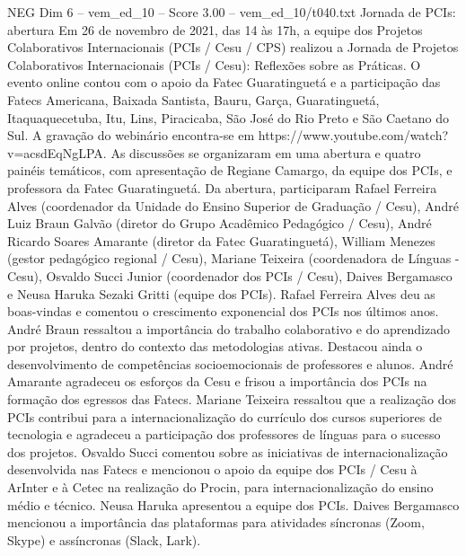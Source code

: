 \begin{textsample}{NEG Dim 6 – vem\_ed\_10 – Score 3.00 – vem\_ed\_10/t040.txt}  \label{ex:f6_neg_128}
Jornada de PCIs: abertura Em 26 de novembro de 2021, das 14 às 17h, a equipe dos Projetos Colaborativos Internacionais (PCIs / Cesu / CPS) realizou a Jornada de Projetos Colaborativos Internacionais (PCIs / Cesu): Reflexões sobre as Práticas.
O evento online contou com o apoio da Fatec Guaratinguetá e a participação das Fatecs Americana, Baixada Santista, Bauru, Garça, Guaratinguetá, Itaquaquecetuba, Itu, Lins, Piracicaba, São José do Rio Preto e São Caetano do Sul.
A gravação do webinário encontra-se em https://www.youtube.com/watch?v=acsdEqNgLPA.
As discussões se organizaram em uma abertura e quatro painéis temáticos, com apresentação de Regiane Camargo, da equipe dos PCIs, e professora da Fatec Guaratinguetá.
Da abertura, participaram Rafael Ferreira Alves (coordenador da Unidade do Ensino Superior de Graduação / Cesu), André Luiz Braun Galvão (diretor do Grupo Acadêmico Pedagógico / Cesu), André Ricardo Soares Amarante (diretor da Fatec Guaratinguetá), William Menezes (gestor pedagógico regional / Cesu), Mariane Teixeira (coordenadora de Línguas - Cesu), Osvaldo Succi Junior (coordenador dos PCIs / Cesu), Daives Bergamasco e Neusa Haruka Sezaki Gritti (equipe dos PCIs).
Rafael Ferreira Alves deu as boas-vindas e comentou o crescimento exponencial dos PCIs nos últimos anos.
André Braun ressaltou a importância do trabalho colaborativo e do aprendizado por projetos, dentro do contexto das metodologias ativas.
Destacou ainda o desenvolvimento de competências socioemocionais de professores e alunos.
André Amarante agradeceu os esforços da Cesu e frisou a importância dos PCIs na formação dos egressos das Fatecs.
Mariane Teixeira ressaltou que a realização dos PCIs contribui para a internacionalização do currículo dos cursos superiores de tecnologia e agradeceu a participação dos professores de línguas para o sucesso dos projetos.
Osvaldo Succi comentou sobre as iniciativas de internacionalização desenvolvida nas Fatecs e mencionou o apoio da equipe dos PCIs / Cesu à ArInter e à Cetec na realização do Procin, para internacionalização do ensino médio e técnico.
Neusa Haruka apresentou a equipe dos PCIs.
Daives Bergamasco mencionou a importância das plataformas para atividades síncronas (Zoom, Skype) e assíncronas (Slack, Lark).

\end{textsample}
